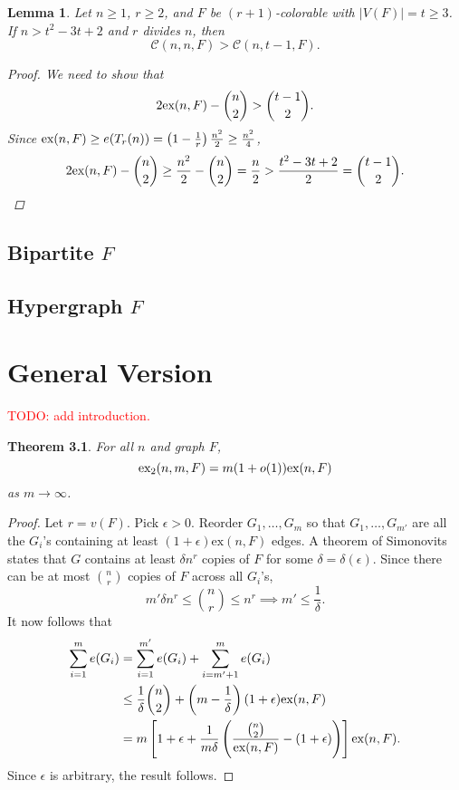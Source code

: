 \documentclass[12pt]{report}
\newtheorem{theorem}{Theorem}[chapter]
\newtheorem{lemma}[theorem]{Lemma}
\newcommand*{\ex}{\textnormal{ex}}
\newcommand*{\dex}{\textnormal{ex}_2}
\newcommand*{\con}{\mathcal{C}}
\begin{document}
\begin{lemma}
  Let $n \geq 1$, $r \geq 2$, and $F$ be $(r + 1)$-colorable with $|V(F)| = t \geq 3$. If $n > t^2 - 3t + 2$ and $r$ divides $n$, then 
  \[
    \con(n, n, F) > \con(n, t - 1, F).
  \]
  \begin{proof}
    We need to show that
    \[
      2\ex(n, F) - \binom{n}{2} > \binom{t - 1}{2}.
    \]
    Since $\ex(n, F) \geq e(T_r(n)) = \left(1 - \frac{1}{r}\right)\frac{n^2}{2} \geq \frac{n^2}{4}$,
    \[
      2\ex(n, F) - \binom{n}{2} \geq \frac{n^2}{2} - \binom{n}{2} = \frac{n}{2} > \frac{t^2 - 3t + 2}{2} = \binom{t - 1}{2}.
    \]
  \end{proof}
\end{lemma}
\section{Bipartite $F$}

\section{Hypergraph $F$}

\chapter{General Version}

\textcolor{red}{TODO: add introduction.}

\begin{theorem}
  For all $n$ and graph $F$,
  \[
    \dex(n, m, F) = m(1 + o(1))\ex(n, F)
  \]
  as $m \to \infty$.
\end{theorem}

\begin{proof}
  Let $r = v(F)$. Pick $\epsilon > 0$. Reorder $G_1, \ldots, G_m$ so that $G_1, \ldots, G_{m'}$ are all the $G_i$'s containing at least $(1 + \epsilon)\text{ex}(n, F)$ edges. A theorem of Simonovits states that $G$ contains at least $\delta n^r$ copies of $F$ for some $\delta = \delta(\epsilon)$. Since there can be at most $\binom{n}{r}$ copies of $F$ across all $G_i$'s, 
  \[
    m'\delta n^{r} \leq \binom{n}{r} \leq n^r \implies m' \leq \frac{1}{\delta}.
  \]
  It now follows that
  \begin{align*}
    \sum_{i = 1}^m e(G_i) 
    &= \sum_{i = 1}^{m'} e(G_i) + \sum_{i = m' + 1}^m e(G_i) \\
    &\leq \frac{1}{\delta}\binom{n}{2} + \left(m - \frac{1}{\delta}\right)(1 + \epsilon)\text{ex}(n, F) \\
    &= m\left[1 + \epsilon + \frac{1}{m\delta}\left(\frac{\binom{n}{2}}{\ex(n, F)} - (1 + \epsilon)\right)\right]\ex(n, F).
  \end{align*}
  Since $\epsilon$ is arbitrary, the result follows.
\end{proof}
\end{document}
